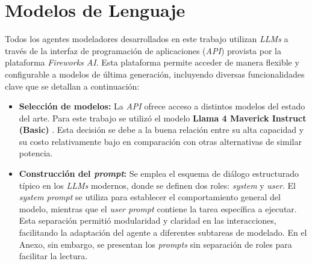 \section{Modelos de Lenguaje}

Todos los agentes modeladores desarrollados en este trabajo utilizan \textit{LLMs} a través de la interfaz de programación de aplicaciones (\textit{API}) provista por la plataforma \textit{Fireworks AI}. Esta plataforma permite acceder de manera flexible y configurable a modelos de última generación, incluyendo diversas funcionalidades clave que se detallan a continuación:

\begin{itemize}
    \item \textbf{Selección de modelos:} La \textit{API} ofrece acceso a distintos modelos del estado del arte. Para este trabajo se utilizó el modelo \textbf{Llama 4 Maverick Instruct (Basic)} \parencite{fireworks2025llama4maverick}. Esta decisión se debe a la buena relación entre su alta capacidad y su costo relativamente bajo en comparación con otras alternativas de similar potencia.
    
    \item \textbf{Construcción del \textit{prompt}:} Se emplea el esquema de diálogo estructurado típico en los \textit{LLMs} modernos, donde se definen dos roles: \textit{system} y \textit{user}. El \textit{system prompt} se utiliza para establecer el comportamiento general del modelo, mientras que el \textit{user prompt} contiene la tarea específica a ejecutar. Esta separación permitió modularidad y claridad en las interacciones, facilitando la adaptación del agente a diferentes subtareas de modelado. En el Anexo, sin embargo, se presentan los \textit{prompts} sin separación de roles para facilitar la lectura.


\end{itemize}
